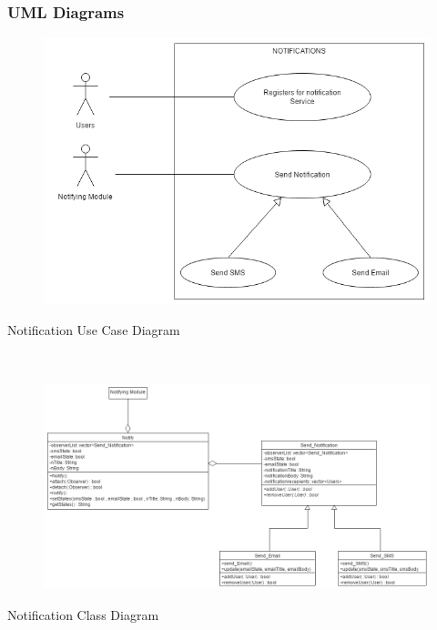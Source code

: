 \documentclass{article}
\begin{document}
    
    \clearpage
    \subsubsection{UML Diagrams}
    
    \begin{figure}[h!]
        \includegraphics[width=\textwidth]{Notifications_Use_Case.png}
    \end{figure}
    Notification Use Case Diagram
    
    \mbox{}\\
    \bigskip
    \clearpage
    
    \begin{figure}[h!]
      \includegraphics[width=\textwidth]{Notifications_Class_Diagram.png}
    \end{figure}
    Notification Class Diagram
    
\end{document}
